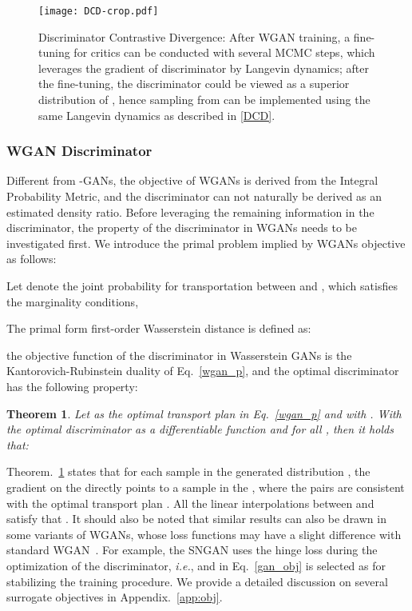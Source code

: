 \documentclass{article}
\newtheorem{theorem}{Theorem}
\begin{document}
\begin{figure*}[!t]\label{fig::overview}
	\centering
    \texttt{[image: DCD-crop.pdf]} 
    \caption{\label{fig:dcd} Discriminator Contrastive Divergence: 
    After WGAN training, a fine-tuning for critics can be conducted with several MCMC steps, which leverages the gradient of discriminator by Langevin dynamics;
    after the fine-tuning, the discriminator could be viewed as a superior distribution of , hence sampling from  can be implemented using the same Langevin dynamics as described in \ref{DCD}.
    }
    \vspace{-5pt}
\end{figure*}

\subsubsection{WGAN Discriminator}\label{sec::wgan-critic}
Different from -GANs, the objective of WGANs is derived from the Integral Probability Metric, and the discriminator can not naturally be derived as an estimated density ratio. Before leveraging the remaining information in the discriminator, the property of the discriminator in WGANs needs to be investigated first. We introduce the primal problem implied by WGANs objective as follows:

Let  denote the joint probability for transportation between  and , which satisfies the marginality conditions,

The primal form first-order Wasserstein distance  is defined as:

the objective function of the discriminator in Wasserstein GANs is the Kantorovich-Rubinstein duality of  Eq.~\ref{wgan_p}, and the optimal discriminator has the following property\cite{gulrajani2017improved}:
\begin{theorem}
\label{gradient_direction}
Let  as the optimal transport plan in Eq.~\ref{wgan_p} and  with . With the optimal discriminator  as a differentiable function and  for all , then it holds that:

\end{theorem}

Theorem.~\ref{gradient_direction} states that for each sample  in the generated distribution , the gradient on the  directly points to a sample  in the , where the  pairs are consistent with the optimal transport plan . All the linear interpolations  between  and  satisfy that . 
It should also be noted that similar results can also be drawn in some variants of WGANs, whose loss functions may have a slight difference with standard WGAN~\cite{zhou2019lipschitz}. 
For example, the SNGAN uses the hinge loss during the optimization of the discriminator, \textit{i.e.},  and  in Eq.~\ref{gan_obj} is selected as  for stabilizing the  training procedure. 
We provide a detailed discussion on several surrogate objectives in Appendix.~\ref{app:obj}.
\end{document}
